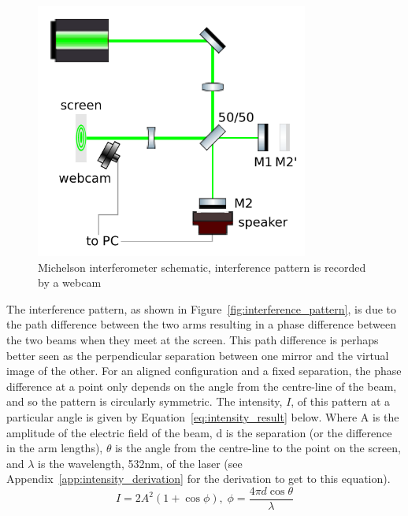 \documentclass[prb,preprint]{revtex4-1}
\begin{document}
\begin{figure}
	\includegraphics[width=0.8\textwidth]{figures/ifo_schematic_webcam.pdf}
	\caption{Michelson interferometer schematic, interference pattern is recorded by a webcam}
	\label{fig:ifo_schematic_webcam}
\end{figure}

The interference pattern, as shown in Figure~\ref{fig:interference_pattern}, is due to the path difference between the two arms resulting in a phase difference between the two beams when they meet at the screen. This path difference is perhaps better seen as the perpendicular separation between one mirror and the virtual image of the other.
For an aligned configuration and a fixed separation, the phase difference at a point only depends on the angle from the centre-line of the beam, and so the pattern is circularly symmetric.
The intensity, $I$, of this pattern at a particular angle is given by Equation~\ref{eq:intensity_result} below. Where A is the amplitude of the electric field of the beam, d is the separation (or the difference in the arm lengths), $\theta$ is the angle from the centre-line to the point on the screen, and $\lambda$ is the wavelength, 532nm, of the laser (see Appendix~\ref{app:intensity_derivation} for the derivation to get to this equation).
\begin{equation}
\label{eq:intensity_result}
I = 2 A^2 (1+\cos{\phi}), \; \phi = \frac{4 \pi d \cos{\theta}}{\lambda}
\end{equation}
\end{document}
